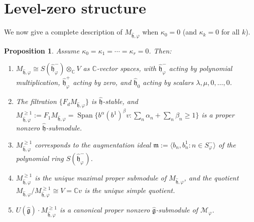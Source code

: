 \documentclass{amsart}
\DeclareMathOperator{\Span}{Span}
\newcommand{\Cx}{\mathbb{C}}
\newcommand{\g}{\mathfrak{g}}
\newcommand{\h}{\mathfrak{h}}
\newcommand{\wh}[1]{\widehat{#1}}
\newcommand{\whg}{\wh{\g}}
\newcommand{\whh}{\wh{\h}}
\newtheorem{proposition}[theorem]{Proposition}
\theoremstyle{definition}
\theoremstyle{remark}
\numberwithin{equation}{section}
\begin{document}
\section{Level-zero structure}\label{sec:level-zero}
We now give a complete description of $M_{\whh,\varphi}$ when
$\kappa_0=0$ (and $\kappa_k=0$ for all $k$).
\begin{proposition}\label{prop:level-zero-submodule}
Assume $\kappa_0=\kappa_1=\cdots=\kappa_r=0$.  Then:
\begin{enumerate}[label=(\alph*)]
\item $M_{\whh,\varphi}\cong S(\whh_\varphi^-)\otimes_\Cx V$ as
  $\Cx$-vector spaces, with $\whh_\varphi^-$ acting by polynomial
  multiplication, $\whh_\varphi^+$ acting by zero, and $\whh_0$
  acting by scalars $\lambda,\mu,0,\dots,0$.
\item The filtration $\{F_dM_{\whh,\varphi}\}$ is $\whh$-stable, and
  $M_{\whh,\varphi}^{\ge1}:=F_1M_{\whh,\varphi}
  =\Span\{b^\alpha(b^1)^\beta v:\sum_n\alpha_n+\sum_n\beta_n\ge1\}$
  is a proper nonzero $\whh$-submodule.
\item $M_{\whh,\varphi}^{\ge1}$ corresponds to the augmentation ideal
  $\mathfrak{m}:=\langle b_n,b_n^1:n\in S_\varphi^-\rangle$ of the
  polynomial ring $S(\whh_\varphi^-)$.
\item $M_{\whh,\varphi}^{\ge1}$ is the unique maximal proper submodule
  of $M_{\whh,\varphi}$, and the quotient
  $M_{\whh,\varphi}/M_{\whh,\varphi}^{\ge1}\cong V=\Cx v$ is the unique
  simple quotient.
\item $U(\whg)\cdot M_{\whh,\varphi}^{\ge1}$ is a canonical proper
  nonzero $\whg$-submodule of $\mathcal M_\varphi$.
\end{enumerate}
\end{proposition}
\end{document}
